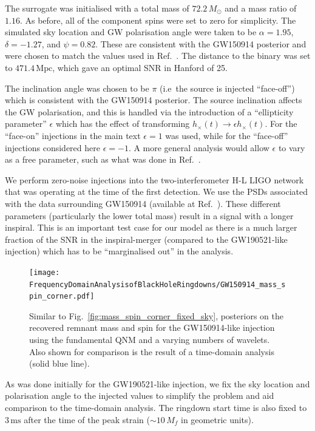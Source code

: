 The surrogate was initialised with a total mass of $72.2\,M_\odot$ and a mass ratio of $1.16$. 
As before, all of the component spins were set to zero for simplicity. 
The simulated sky location and GW polarisation angle were taken to be $\alpha = 1.95$, $\delta = -1.27$, and $\psi = 0.82$. These are consistent with the GW150914 posterior and were chosen to match the values used in Ref.~\cite{Isi:2019aib}.
The distance to the binary was set to $471.4\,\mathrm{Mpc}$, which gave an optimal SNR in Hanford of 25.

The inclination angle was chosen to be $\pi$ (i.e\ the source is injected ``face-off'') which is consistent with the GW150914 posterior.
The source inclination affects the GW polarisation, and this is handled via the introduction of a ``ellipticity parameter'' $\epsilon$ which has the effect of transforming $h_\times(t) \rightarrow \epsilon h_\times(t)$.
For the ``face-on'' injections in the main text $\epsilon=1$ was used, while for the ``face-off'' injections considered here $\epsilon=-1$.
A more general analysis would allow $\epsilon$ to vary as a free parameter, such as what was done in Ref.~\cite{Isi:2021iql}.

We perform zero-noise injections into the two-interferometer H-L LIGO network that was operating at the time of the first detection. 
We use the PSDs associated with the data surrounding GW150914 (available at Ref.~\cite{gwtc1psds}).
These different parameters (particularly the lower total mass) result in a signal with a longer inspiral.
This is an important test case for our model as there is a much larger fraction of the SNR in the inspiral-merger (compared to the GW190521-like injection) which has to be ``marginalised out'' in the analysis.

\begin{figure}[t!]
    \centering
    \texttt{[image: FrequencyDomainAnalysisofBlackHoleRingdowns/GW150914\_mass\_spin\_corner.pdf]}
    \caption[Posteriors on the remnant mass and spin for a GW150914-like injection analysed with a fixed sky location and ringdown start time, for different numbers of wavelets]{ 
    Similar to Fig.~\ref{fig:mass_spin_corner_fixed_sky}, posteriors on the recovered remnant mass and spin for the GW150914-like injection using the fundamental QNM and a varying numbers of wavelets. 
    Also shown for comparison is the result of a time-domain analysis (solid blue line).
    }
    \label{fig:GW150914_mass_spin_corner}
\end{figure}

As was done initially for the GW190521-like injection, we fix the sky location and polarisation angle to the injected values to simplify the problem and aid comparison to the time-domain analysis.
The ringdown start time is also fixed to $3\,\mathrm{ms}$ after the time of the peak strain ($\sim 10\,M_f$ in geometric units).

